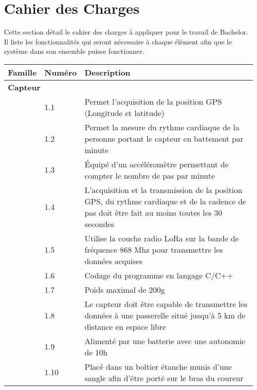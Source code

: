 \chapter{Cahier des Charges}

Cette section détail le cahier des charges à appliquer pour le travail de Bachelor. Il liste les fonctionnalités qui seront nécessaire à chaque élément afin que le système dans son ensemble puisse fonctionner.

\begin{tabular}{llp{10cm}}
\toprule
Famille & Numéro & Description \\
\midrule
\multicolumn{2}{l}{\textbf{Capteur}} \\
 & 1.1 & Permet l’acquisition de la position GPS (Longitude et latitude) \\
 & 1.2 & Permet la mesure du rythme cardiaque de la personne portant le capteur en battement par minute\\
 & 1.3 & Équipé d’un accéléromètre permettant de compter le nombre de pas par minute \\
 & 1.4 & L’acquisition et la transmission de la position GPS, du rythme cardiaque et de la cadence de pas doit être fait au moins toutes les 30 secondes \\
 & 1.5 & Utilise la couche radio LoRa sur la bande de fréquence 868 Mhz pour transmettre les données acquises \\
 & 1.6 & Codage du programme en langage C/C++ \\
 & 1.7 & Poids maximal de 200g \\
 & 1.8 & Le capteur doit être capable de transmettre les données à une passerelle situé jusqu’à 5 km de distance en espace libre \\
 & 1.9 & Alimenté par une batterie avec une autonomie de 10h \\
 & 1.10 & Placé dans un boîtier étanche munis d’une sangle afin d’être porté sur le bras du coureur \\
\bottomrule
\end{tabular}

